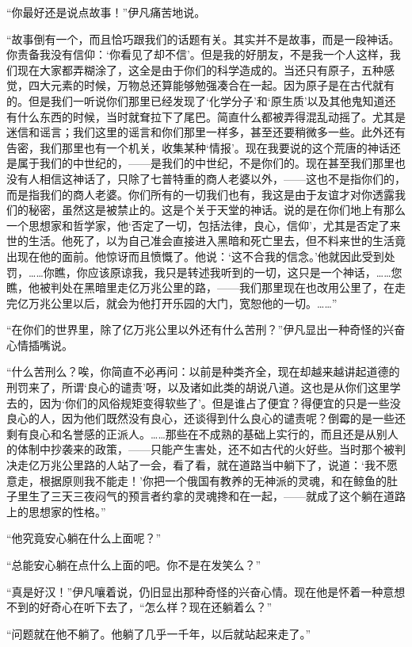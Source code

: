 \par “你最好还是说点故事！”伊凡痛苦地说。
\par “故事倒有一个，而且恰巧跟我们的话题有关。其实并不是故事，而是一段神话。你责备我没有信仰：‘你看见了却不信’。但是我的好朋友，不是我一个人这样，我们现在大家都弄糊涂了，这全是由于你们的科学造成的。当还只有原子，五种感觉，四大元素的时候，万物总还算能够勉强凑合在一起。因为原子是在古代就有的。但是我们一听说你们那里已经发现了‘化学分子’和‘原生质’以及其他鬼知道还有什么东西的时候，当时就耷拉下了尾巴。简直什么都被弄得混乱动摇了。尤其是迷信和谣言；我们这里的谣言和你们那里一样多，甚至还要稍微多一些。此外还有告密，我们那里也有一个机关，收集某种‘情报’。现在我要说的这个荒唐的神话还是属于我们的中世纪的，——是我们的中世纪，不是你们的。现在甚至我们那里也没有人相信这神话了，只除了七普特重的商人老婆以外，——这也不是指你们的，而是指我们的商人老婆。你们所有的一切我们也有，我这是由于友谊才对你透露我们的秘密，虽然这是被禁止的。这是个关于天堂的神话。说的是在你们地上有那么一个思想家和哲学家，他‘否定了一切，包括法律，良心，信仰’，尤其是否定了来世的生活。他死了，以为自己准会直接进入黑暗和死亡里去，但不料来世的生活竟出现在他的面前。他惊讶而且愤慨了。他说：‘这不合我的信念。’他就因此受到处罚，……你瞧，你应该原谅我，我只是转述我听到的一切，这只是一个神话，……您瞧，他被判处在黑暗里走亿万兆公里的路，——我们那里现在也改用公里了，在走完亿万兆公里以后，就会为他打开乐园的大门，宽恕他的一切。……”
\par “在你们的世界里，除了亿万兆公里以外还有什么苦刑？”伊凡显出一种奇怪的兴奋心情插嘴说。
\par “什么苦刑么？唉，你简直不必再问：以前是种类齐全，现在却越来越讲起道德的刑罚来了，所谓‘良心的谴责’呀，以及诸如此类的胡说八道。这也是从你们这里学去的，因为‘你们的风俗规矩变得软些了’。但是谁占了便宜？得便宜的只是一些没良心的人，因为他们既然没有良心，还谈得到什么良心的谴责呢？倒霉的是一些还剩有良心和名誉感的正派人。……那些在不成熟的基础上实行的，而且还是从别人的体制中抄袭来的政策，——只能产生害处，还不如古代的火好些。当时那个被判决走亿万兆公里路的人站了一会，看了看，就在道路当中躺下了，说道：‘我不愿意走，根据原则我不能走！’你把一个俄国有教养的无神派的灵魂，和在鲸鱼的肚子里生了三天三夜闷气的预言者约拿的灵魂搀和在一起，——就成了这个躺在道路上的思想家的性格。”
\par “他究竟安心躺在什么上面呢？”
\par “总能安心躺在点什么上面的吧。你不是在发笑么？”
\par “真是好汉！”伊凡嚷着说，仍旧显出那种奇怪的兴奋心情。现在他是怀着一种意想不到的好奇心在听下去了，“怎么样？现在还躺着么？”
\par “问题就在他不躺了。他躺了几乎一千年，以后就站起来走了。”
